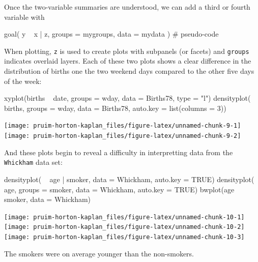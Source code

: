 Once the two-variable summaries are understood, we can add a third or
fourth variable with

\begin{Schunk}
\begin{Sinput}
goal( y ~ x | z, groups = mygroups, data = mydata )    # pseudo-code
\end{Sinput}
\end{Schunk}

\noindent
When plotting, \texttt{z} is used to create plots with subpanels (or
facets) and \texttt{groups} indicates overlaid layers. Each of these two
plots shows a clear difference in the distribution of births one the two
weekend days compared to the other five days of the week:

\begin{Schunk}
\begin{Sinput}
xyplot(births ~ date, groups = wday, data = Births78, type = "l")
densityplot( ~ births, groups = wday, data = Births78, auto.key = list(columns = 3))
\end{Sinput}


\begin{center}\texttt{[image: pruim-horton-kaplan\_files/figure-latex/unnamed-chunk-9-1]} \texttt{[image: pruim-horton-kaplan\_files/figure-latex/unnamed-chunk-9-2]} \end{center}

\end{Schunk}

And these plots begin to reveal a difficulty in interpretting data from
the \texttt{Whickham} data set:

\begin{Schunk}
\begin{Sinput}
densityplot( ~ age | smoker, data = Whickham, auto.key = TRUE)
densityplot( ~ age, groups = smoker, data = Whickham, auto.key = TRUE)
bwplot(age ~ smoker, data = Whickham)
\end{Sinput}


\begin{center}\texttt{[image: pruim-horton-kaplan\_files/figure-latex/unnamed-chunk-10-1]} \texttt{[image: pruim-horton-kaplan\_files/figure-latex/unnamed-chunk-10-2]} \texttt{[image: pruim-horton-kaplan\_files/figure-latex/unnamed-chunk-10-3]} \end{center}

\end{Schunk}

\noindent
The smokers were on average younger than the non-smokers.

